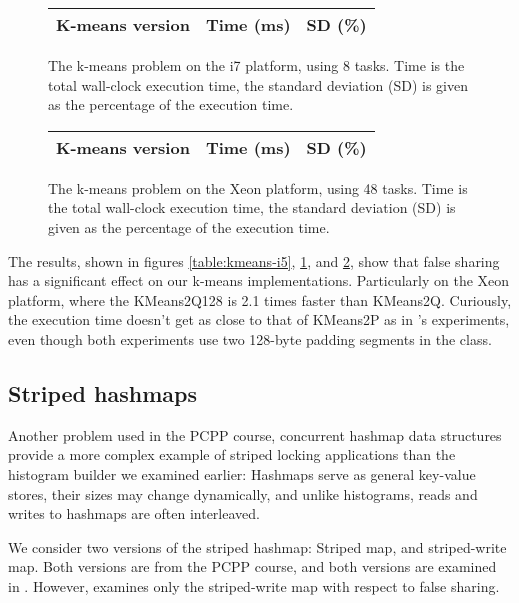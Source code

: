 \begin{figure}[hbtp]
	\centering
	\begin{tabular}{l r r}
		\hline
		\hline
		K-means version & Time (ms) & SD (\%) \\
		\hline
		
		\hline
		\hline
	\end{tabular}
	\caption{The k-means problem on the i7 platform, using 8 tasks.  Time is
	the total wall-clock execution time, the standard deviation (SD) is
	given as the percentage of the execution time.}
	\label{table:kmeans-i7}
\end{figure}

\begin{figure}[hbtp]
	\centering
	\begin{tabular}{l r r}
		\hline
		\hline
		K-means version & Time (ms) & SD (\%) \\
		\hline
		
		\hline
		\hline
	\end{tabular}
	\caption{The k-means problem on the Xeon platform, using 48 tasks.
	Time is the total wall-clock execution time, the standard deviation (SD)
	is given as the percentage of the execution time.}
	\label{table:kmeans-xeon}
\end{figure}

The results, shown in figures \ref{table:kmeans-i5}, \ref{table:kmeans-i7}, and
\ref{table:kmeans-xeon}, show that false sharing has a significant effect on our 
k-means implementations. Particularly on the Xeon platform, where the KMeans2Q128
is 2.1 times faster than KMeans2Q. Curiously, the execution time doesn't get as
close to that of KMeans2P as in \citeauthor{mystery}'s experiments, even though
both experiments use two 128-byte padding segments in the  class.

\subsection{Striped hashmaps}
Another problem used in the PCPP course, concurrent hashmap data structures
provide a more complex example of striped locking applications than the
histogram builder we examined earlier: Hashmaps serve as general key-value
stores, their sizes may change dynamically, and unlike histograms, reads
and writes to hashmaps are often interleaved.

We consider two versions of the striped hashmap: Striped map, and striped-write
map. Both versions are from the PCPP course, and both versions are examined in
\cite{mystery}. However, \cite{mystery} examines only the striped-write map
with respect to false sharing.

